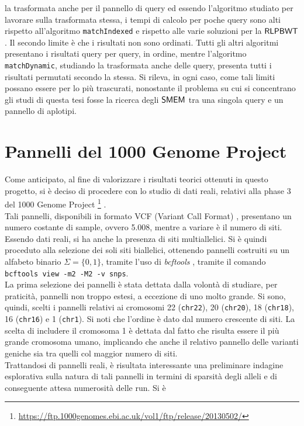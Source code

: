 la trasformata anche per il pannello di query ed essendo l'algoritmo studiato
per lavorare sulla trasformata stessa, i tempi di calcolo per poche query sono
alti rispetto all'algoritmo \texttt{matchIndexed} e rispetto alle varie
soluzioni per la $\mbox{\rm {\sf RLPBWT}}$. Il secondo limite è che i risultati non sono
ordinati. Tutti gli altri algoritmi presentano i risultati query per query, in
ordine, mentre l'algoritmo \texttt{matchDynamic}, studiando la trasformata anche
delle query,
presenta tutti i risultati permutati secondo la stessa. Si rileva, in ogni caso,
come tali limiti possano essere per lo più trascurati, nonostante il problema su
cui si concentrano gli studi di questa tesi fosse la ricerca degli $\mbox{\rm {\sf SMEM}}$ tra
una 
singola query e un pannello di aplotipi.
\section{Pannelli del 1000 Genome Project}
Come anticipato, al fine di valorizzare i risultati teorici ottenuti in
questo progetto, si 
è deciso di procedere con lo studio di dati reali, relativi alla phase
  3 del 1000 Genome Project
\footnote{\url{https://ftp.1000genomes.ebi.ac.uk/vol1/ftp/release/20130502/}}
\cite{1kgp}.\\ 
Tali pannelli, disponibili in formato VCF (Variant Call Format) \cite{vcf},
presentano un numero 
costante di sample, ovvero 5.008, mentre a variare è il numero di siti. Essendo
dati reali, si ha anche la presenza di siti multiallelici. Si è quindi proceduto
alla selezione dei soli siti biallelici, ottenendo pannelli costruiti su
un alfabeto binario $\Sigma=\{0,1\}$, tramite l'uso di \textit{bcftools}
\cite{bcftools}, tramite il comando \texttt{bcftools view -m2 -M2
  -v snps}.\\
La prima selezione dei pannelli è stata dettata dalla volontà di studiare, per
praticità, pannelli non troppo estesi, a eccezione di uno molto grande. Si
sono, 
quindi, scelti i pannelli relativi ai cromosomi 22 (\texttt{chr22}), 20
(\texttt{chr20}), 18 (\texttt{chr18}), 16 (\texttt{chr16}) e 1 (\texttt{chr1}).
Si noti che  
l'ordine è dato dal numero crescente di siti. La scelta di includere il
cromosoma 1 è dettata dal fatto che risulta essere il più grande cromosoma
umano, implicando che anche il relativo pannello delle varianti geniche
sia tra quelli col maggior numero di siti.\\
Trattandosi di pannelli reali, è risultata interessante una preliminare
indagine esplorativa sulla natura di tali pannelli in termini di
sparsità degli alleli e di conseguente attesa numerosità delle run. Si è
